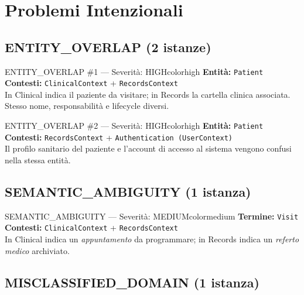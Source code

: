 \documentclass[12pt,a4paper]{report}
\begin{document}
\section{Problemi Intenzionali}

\subsection{ENTITY\_OVERLAP (2 istanze)}

\begin{issuebox}{ENTITY\_OVERLAP \#1 --- Severità: HIGH}{colorhigh}
\textbf{Entità:} \texttt{Patient} \\
\textbf{Contesti:} \texttt{ClinicalContext} + \texttt{RecordsContext} \\
In Clinical indica il paziente da visitare; in Records la cartella clinica associata.
Stesso nome, responsabilità e lifecycle diversi.
\end{issuebox}

\vspace{0.5em}

\begin{issuebox}{ENTITY\_OVERLAP \#2 --- Severità: HIGH}{colorhigh}
\textbf{Entità:} \texttt{Patient} \\
\textbf{Contesti:} \texttt{RecordsContext} + \texttt{Authentication (UserContext)} \\
Il profilo sanitario del paziente e l'account di accesso al sistema vengono confusi
nella stessa entità.
\end{issuebox}

\subsection{SEMANTIC\_AMBIGUITY (1 istanza)}

\begin{issuebox}{SEMANTIC\_AMBIGUITY --- Severità: MEDIUM}{colormedium}
\textbf{Termine:} \texttt{Visit} \\
\textbf{Contesti:} \texttt{ClinicalContext} + \texttt{RecordsContext} \\
In Clinical indica un \textit{appuntamento} da programmare;
in Records indica un \textit{referto medico} archiviato.
\end{issuebox}

\subsection{MISCLASSIFIED\_DOMAIN (1 istanza)}
\end{document}
